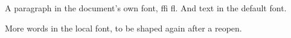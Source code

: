\documentclass{article}
\begin{document}
{\mine A paragraph in the document's own font, ffi fl.} And text in the default font.

\mine More words in the local font, to be shaped again after a reopen.
\end{document}

